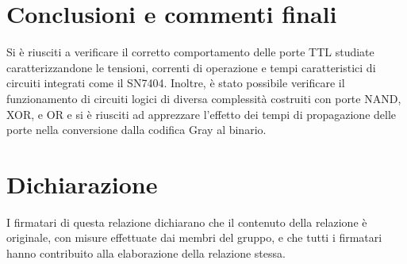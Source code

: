\documentclass[10pt, a4paper, italian]{article}
\begin{document}
\section*{Conclusioni e commenti finali}
Si è riusciti a verificare il corretto comportamento delle porte TTL studiate
caratterizzandone le tensioni, correnti di operazione e tempi caratteristici
di circuiti integrati come il SN7404.
Inoltre, è stato possibile verificare il funzionamento di circuiti logici di
diversa complessità costruiti con porte NAND, XOR, e OR e si è riusciti ad
apprezzare l'effetto dei tempi di propagazione delle porte nella conversione
dalla codifica Gray al binario.

\section*{Dichiarazione}
I firmatari di questa relazione dichiarano che il contenuto della relazione \`e
originale, con misure effettuate dai membri del gruppo, e che tutti i firmatari
hanno contribuito alla elaborazione della relazione stessa.
\end{document}
